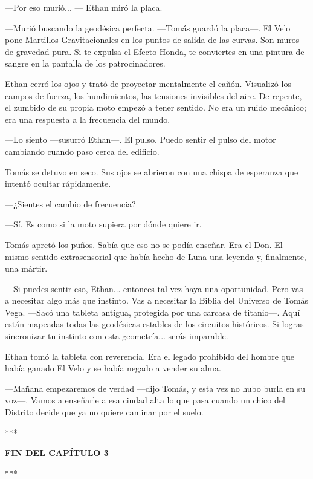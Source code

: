 \documentclass[11pt,twoside]{book}
\begin{document}
---Por eso murió... --- Ethan miró la placa.

---Murió buscando la geodésica perfecta. ---Tomás guardó la placa---. El Velo pone Martillos Gravitacionales en los puntos de salida de las curvas. Son muros de gravedad pura. Si te expulsa el Efecto Honda, te conviertes en una pintura de sangre en la pantalla de los patrocinadores.

Ethan cerró los ojos y trató de proyectar mentalmente el cañón. Visualizó los campos de fuerza, los hundimientos, las tensiones invisibles del aire. De repente, el zumbido de su propia moto empezó a tener sentido. No era un ruido mecánico; era una respuesta a la frecuencia del mundo.

---Lo siento ---susurró Ethan---. El pulso. Puedo sentir el pulso del motor cambiando cuando paso cerca del edificio.

Tomás se detuvo en seco. Sus ojos se abrieron con una chispa de esperanza que intentó ocultar rápidamente.

---¿Sientes el cambio de frecuencia?

---Sí. Es como si la moto supiera por dónde quiere ir.

Tomás apretó los puños. Sabía que eso no se podía enseñar. Era el Don. El mismo sentido extrasensorial que había hecho de Luna una leyenda y, finalmente, una mártir.

---Si puedes sentir eso, Ethan... entonces tal vez haya una oportunidad. Pero vas a necesitar algo más que instinto. Vas a necesitar la Biblia del Universo de Tomás Vega. ---Sacó una tableta antigua, protegida por una carcasa de titanio---. Aquí están mapeadas todas las geodésicas estables de los circuitos históricos. Si logras sincronizar tu instinto con esta geometría... serás imparable.

Ethan tomó la tableta con reverencia. Era el legado prohibido del hombre que había ganado El Velo y se había negado a vender su alma.

---Mañana empezaremos de verdad ---dijo Tomás, y esta vez no hubo burla en su voz---. Vamos a enseñarle a esa ciudad alta lo que pasa cuando un chico del Distrito decide que ya no quiere caminar por el suelo.

\bigskip
\begin{center}***\end{center}
\bigskip

\textbf{FIN DEL CAPÍTULO 3}


\bigskip
\begin{center}***\end{center}
\bigskip
\end{document}
